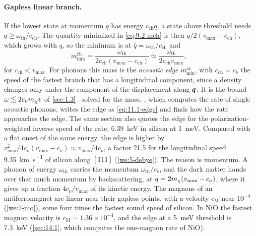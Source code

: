 \paragraph{Gapless linear branch.} If the lowest state at momentum $q$ has energy $c_{\mathrm{ch}}q$, a state above threshold needs $q \ge \omega_{\mathrm{th}}/c_{\mathrm{ch}}$. The quantity minimized in \cref{eq:9.2-mch} is then $q/2(v_{\mathrm{max}} - c_{\mathrm{ch}})$, which grows with $q$, so the minimum is at $\bar q = \omega_{\mathrm{th}}/c_{\mathrm{ch}}$ and
\begin{equation*}
  m_{\mathrm{min}}^{\mathrm{ch}} = \frac{\omega_{\mathrm{th}}}{2c_{\mathrm{ch}}(v_{\mathrm{max}} - c_{\mathrm{ch}})} \simeq \frac{\omega_{\mathrm{th}}}{2c_{\mathrm{ch}}v_{\mathrm{max}}} ,
\end{equation*}
for $c_{\mathrm{ch}} < v_{\mathrm{max}}$. For phonons this mass is the \emph{acoustic edge} $m_{\mathrm{min}}^{\mathrm{ac}}$, with $c_{\mathrm{ch}} = c_\nu$ the speed of the fastest branch that has a longitudinal component, since a density changes only under the component of the displacement along $\bm{q}$. It is the bound $\omega \lesssim 2c_\nu m_{\chi} v$ of \cref{sec:1.3}~\cite[Eq.~(93)]{kahn2022searches} solved for the mass. , which computes the rate of single acoustic phonons, writes the edge as \cref{eq:11.1-edge} and finds how the rate approaches the edge. The same section also quotes the edge for the polarization-weighted inverse speed of the rate, \SI{6.39}{keV} in silicon at \SI{1}{meV}. Compared with a flat onset of the same energy, the edge is higher by $v_{\mathrm{max}}^2/4c_\nu(v_{\mathrm{max}} - c_\nu) \approx v_{\mathrm{max}}/4c_\nu$, a factor 21.5 for the longitudinal speed \SI{9.35}{km.s^{-1}} of silicon along $[111]$ (\cref{we:5-debye}). The reason is momentum. A phonon of energy $\omega_{\mathrm{th}}$ carries the momentum $\omega_{\mathrm{th}}/c_\nu$, and the dark matter hands over that much momentum by backscattering, at $q = 2m_{\chi}(v_{\mathrm{max}} - c_\nu)$, where it gives up a fraction $4c_\nu/v_{\mathrm{max}}$ of its kinetic energy. The magnons of an antiferromagnet are linear near their gapless points, with a velocity $c_{\mathrm{M}}$ near $10^{-4}$ (\cref{we:7-nio}), some four times the fastest sound speed of silicon. In NiO the fastest magnon velocity is $c_{\mathrm{M}} = 1.36\times10^{-4}$, and the edge at a \SI{5}{meV} threshold is \SI{7.3}{keV} (\cref{sec:14.1}, which computes the one-magnon rate of NiO).

